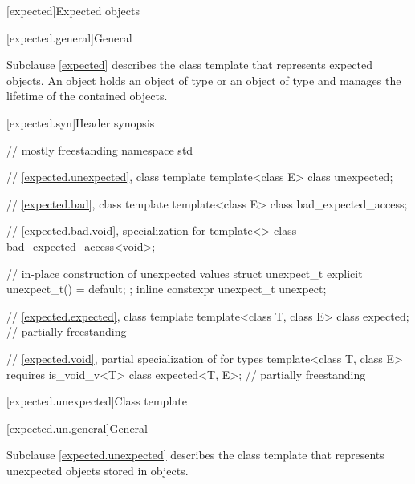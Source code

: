 [expected]{Expected objects}
%

[expected.general]{General}

\pnum
Subclause \ref{expected} describes the class template 
that represents expected objects.
An  object holds
an object of type  or an object of type  and
manages the lifetime of the contained objects.

[expected.syn]{Header  synopsis}

%
%
%
\begin{codeblock}
// mostly freestanding
namespace std {
  // \ref{expected.unexpected}, class template 
  template<class E> class unexpected;

  // \ref{expected.bad}, class template 
  template<class E> class bad_expected_access;

  // \ref{expected.bad.void}, specialization for 
  template<> class bad_expected_access<void>;

  // in-place construction of unexpected values
  struct unexpect_t {
    explicit unexpect_t() = default;
  };
  inline constexpr unexpect_t unexpect{};

  // \ref{expected.expected}, class template 
  template<class T, class E> class expected;                                // partially freestanding

  // \ref{expected.void}, partial specialization of  for  types
  template<class T, class E> requires is_void_v<T> class expected<T, E>;    // partially freestanding
}
\end{codeblock}

[expected.unexpected]{Class template }

[expected.un.general]{General}

\pnum
Subclause \ref{expected.unexpected} describes the class template 
that represents unexpected objects stored in  objects.

